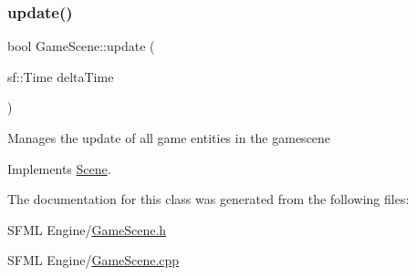 \subsubsection{\texorpdfstring{update()}{update()}}
{\footnotesize\ttfamily bool Game\+Scene\+::update (\begin{DoxyParamCaption}\item[{sf\+::\+Time}]{delta\+Time }\end{DoxyParamCaption})\hspace{0.3cm}{\ttfamily [virtual]}}

Manages the update of all game entities in the gamescene 

Implements \hyperlink{class_scene_a72683c984a1da2ce4f757705e93730f2}{Scene}.



The documentation for this class was generated from the following files\+:\begin{DoxyCompactItemize}
\item 
S\+F\+M\+L Engine/\hyperlink{_game_scene_8h}{Game\+Scene.\+h}\item 
S\+F\+M\+L Engine/\hyperlink{_game_scene_8cpp}{Game\+Scene.\+cpp}\end{DoxyCompactItemize}

